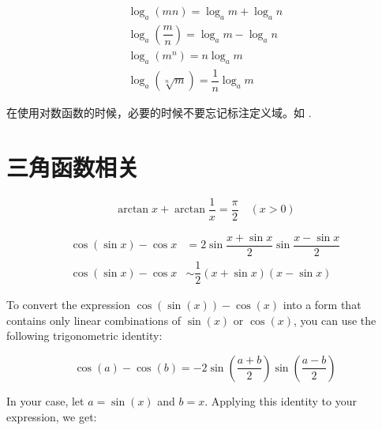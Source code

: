 \begin{theorem}
    \begin{gather*}
        \log_a (mn) = \log_a m + \log_a n \\
        \log_a \left(\dfrac{m}{n}\right) = \log_a m - \log_a n \\
        \log_a \left(m^n\right) = n \log_a m  \\
        \log_a \left(\sqrt[n]{m}\right) = \dfrac{1}{n} \log_a m
    \end{gather*}
\end{theorem}

在使用对数函数的时候，必要的时候不要忘记标注定义域。如
\cite[page 76, pdf 87, example 2]{we}.

\section{三角函数相关} \label{trigonometric}

\begin{corollary}
    \begin{equation}
        \arctan x + \arctan \dfrac{1}{x} = \dfrac{\pi}{2} \quad (x > 0)
    \end{equation}
\end{corollary}

\begin{corollary}
    \begin{align}
        \cos(\sin x) - \cos x &=    2 \sin \dfrac{x + \sin x}{2} \sin \dfrac{x- \sin x}{2} \label{eq:fucking-socalled-trig-formula} \\
        \cos(\sin x) - \cos x &\sim \dfrac{1}{2} ( x + \sin x )( x - \sin x ) 
    \end{align}
\end{corollary}

To convert the expression $\cos(\sin(x)) - \cos(x)$ 
into a form that contains only linear combinations of 
$\sin(x)$ or $\cos(x)$, 
you can use the following trigonometric identity:

\begin{theorem}
    \label{thm:a-magic-theorem-which-I-dont-know-its-name-about-trig}
    \begin{equation*}
        \cos(a) - \cos(b) = -2 \sin\left(\frac{a + b}{2}\right) \sin\left(\frac{a - b}{2}\right)
    \end{equation*}
\end{theorem}

In your case, let $a = \sin(x)$ and $b = x$. 
Applying this identity to your expression, we get:

